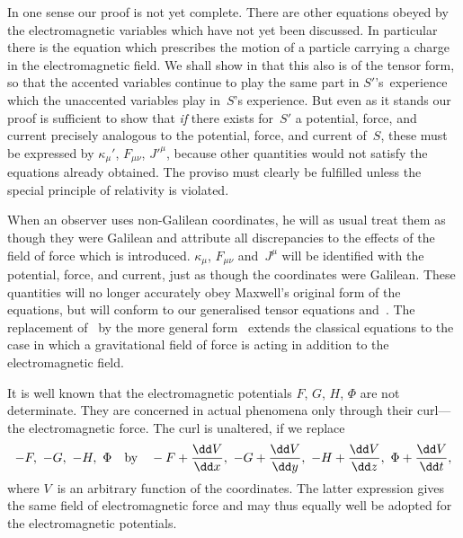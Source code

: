 \documentclass[12pt]{book}
\begin{document}
In one sense our proof is not yet complete. There are other equations
obeyed by the electromagnetic variables which have not yet been discussed.
In particular there is the equation which prescribes the motion of a particle
carrying a charge in the electromagnetic field. We shall show in  that
this also is of the tensor form, so that the accented variables continue to play
the same part in $S'$'s~experience which the unaccented variables play in~$S$'s
experience. But even as it stands our proof is sufficient to show that \emph{if} there
exists for~$S'$ a potential, force, and current precisely analogous to the potential,
%
force, and current of~$S$, these must be expressed by $\kappa_{\mu}'$, $F_{\mu\nu}$, $J'^{\mu}$, because other
quantities would not satisfy the equations already obtained. The proviso must
clearly be fulfilled unless the special principle of relativity is violated.

When an observer uses non-Galilean coordinates, he will as usual treat
them as though they were Galilean and attribute all discrepancies to the
effects of the field of force which is introduced. $\kappa_{\mu}$, $F_{\mu\nu}$ and~$J^{\mu}$ will be identified
with the potential, force, and current, just as though the coordinates were
Galilean. These quantities will no longer accurately obey Maxwell's original
form of the equations, but will conform to our generalised tensor equations
 and~. The replacement of~ by the more general form~
extends the classical equations to the case in which a gravitational
field of force is acting in addition to the electromagnetic field.

%
%
%

%

It is well known that the electromagnetic potentials $F$, $G$, $H$, $\Phi$ are not
determinate. They are concerned in actual phenomena only through their
curl---the electromagnetic force. The curl is unaltered, if we replace
\[
-F,\ -G,\ -H,\ \Phi\quad\text{by}\quad
-F + \frac{\dd V}{\dd x},\
-G + \frac{\dd V}{\dd \smash[b]{y}},\
-H + \frac{\dd V}{\dd z},\
\Phi + \frac{\dd V}{\dd t},
\]
where $V$~is an arbitrary function of the coordinates. The latter expression
gives the same field of electromagnetic force and may thus equally well be
adopted for the electromagnetic potentials.
\end{document}

